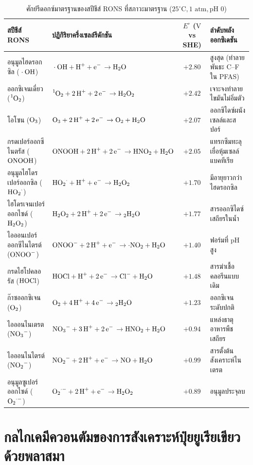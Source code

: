 \begin{table}[H]
\centering
\caption{ศักย์รีดอกซ์มาตรฐานของสปีชีส์ RONS ที่สภาวะมาตรฐาน ($25^\circ\text{C}, 1\text{ atm}, \text{pH } 0$)}
\label{tab:app_redox_table}
\begin{tabularx}{\textwidth}{l l c X}
\toprule
\textbf{สปีชีส์ RONS} & \textbf{ปฏิกิริยาครึ่งเซลล์รีดักชัน} & \textbf{$E^\circ$ ($\si{\volt}$ vs SHE)} & \textbf{ลำดับพลังออกซิเดชัน} \\
\midrule
อนุมูลไฮดรอกซิล ($\ce{\cdot OH}$) & $\ce{\cdot OH + H+ + e- \to H2O}$ & $+2.80$ & สูงสุด (ทำลายพันธะ C--F ใน PFAS) \\
ออกซิเจนเดี่ยว ($\ce{^1O2}$) & $\ce{^1O2 + 2H+ + 2e- \to H2O2}$ & $+2.42$ & เจาะจงทำลายไขมันไม่อิ่มตัว \\
โอโซน ($\ce{O3}$) & $\ce{O3 + 2H+ + 2e- \to O2 + H2O}$ & $+2.07$ & ออกซิไดซ์ผนังเซลล์และสปอร์ \\
กรดเปอร์ออกซีไนตรัส ($\ce{ONOOH}$) & $\ce{ONOOH + 2H+ + 2e- \to HNO2 + H2O}$ & $+2.05$ & แทรกซึมทะลุเยื่อหุ้มเซลล์แบคทีเรีย \\
อนุมูลไฮโดรเปอร์ออกซิล ($\ce{HO2^{\cdot}}$) & $\ce{HO2^{\cdot} + H+ + e- \to H2O2}$ & $+1.70$ & มีอายุยาวกว่าไฮดรอกซิล \\
ไฮโดรเจนเปอร์ออกไซด์ ($\ce{H2O2}$) & $\ce{H2O2 + 2H+ + 2e- \to 2H2O}$ & $+1.77$ & สารออกซิไดซ์เสถียรในน้ำ \\
ไอออนเปอร์ออกซีไนไตรต์ ($\ce{ONOO^-}$) & $\ce{ONOO^- + 2H+ + e- \to \cdot NO2 + H2O}$ & $+1.40$ & ฟอร์มที่ pH สูง \\
กรดไฮโปคลอรัส ($\ce{HOCl}$) & $\ce{HOCl + H+ + 2e- \to Cl- + H2O}$ & $+1.48$ & สารฆ่าเชื้อคลอรีนแบบเดิม \\
ก๊าซออกซิเจน ($\ce{O2}$) & $\ce{O2 + 4H+ + 4e- \to 2H2O}$ & $+1.23$ & ออกซิเจนระดับปกติ \\
ไอออนไนเตรต ($\ce{NO3^-}$) & $\ce{NO3^- + 3H+ + 2e- \to HNO2 + H2O}$ & $+0.94$ & แหล่งธาตุอาหารพืชเสถียร \\
ไอออนไนไตรต์ ($\ce{NO2^-}$) & $\ce{NO2^- + 2H+ + e- \to NO + H2O}$ & $+0.99$ & สารตั้งต้นสังเคราะห์ไนเตรต \\
อนุมูลซูเปอร์ออกไซด์ ($\ce{O2^{\cdot -}}$) & $\ce{O2^{\cdot -} + 2H+ + e- \to H2O2}$ & $+0.89$ & อนุมูลประจุลบ \\
\bottomrule
\end{tabularx}
\end{table}

\section{กลไกเคมีควอนตัมของการสังเคราะห์ปุ๋ยยูเรียเขียวด้วยพลาสมา}
\label{app:sec_urea_mechanism}


